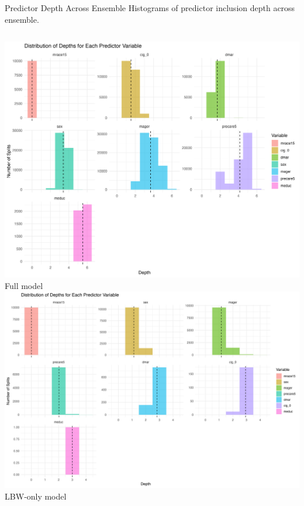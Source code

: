 \documentclass[aspectratio=169,professionalfonts]{beamer}
\begin{document}
\begin{frame}{Predictor Depth Across Ensemble}
\small Histograms of predictor inclusion depth across ensemble.
\begin{columns}[T]
    \centering
    \includegraphics[width=\linewidth]{plots/depth_distributions.png}\\[-2pt]
    {\footnotesize Full model}
    \centering
    \includegraphics[width=\linewidth]{plots/depth_distributions_2.png}\\[-2pt]
    {\footnotesize LBW‑only model}
\end{columns}
\end{frame}
\end{document}
